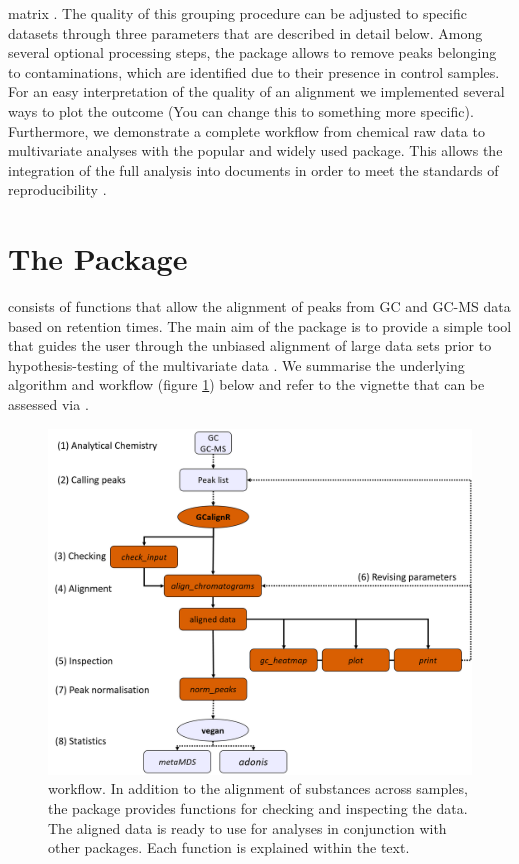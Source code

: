 matrix . The quality of this grouping procedure can be adjusted to
specific datasets through three parameters that are described in detail
below. Among several optional processing steps, the package allows to
remove peaks belonging to contaminations, which are identified due to
their presence in control samples. For an easy interpretation of the
quality of an alignment we implemented several ways to plot the outcome
(You can change this to something more specific). Furthermore, we
demonstrate a complete workflow from chemical raw data to multivariate
analyses with the popular and widely used
\href{https://cran.r-project.org/web/packages/vegan/index.html}{}
\citep{Oksanen.2016} package. This allows the integration of the full
analysis into  documents \citep{Allaire.2016} in order
to meet the standards of reproducibility \citep{Peng.2011}.

\section{The Package}

 consists of functions that allow the alignment of peaks
from GC and GC-MS data based on retention times. The main aim of the
package is to provide a simple tool that guides the user through the
unbiased alignment of large data sets prior to hypothesis-testing of the
multivariate data \citep{Anderson.2001}. We summarise the underlying
algorithm and workflow (figure \ref{figure:workflow}) below and refer to
the vignette that can be assessed via
.

\begin{figure}[htbp]
  \centering
  \includegraphics[width=13cm]{figures/workflow}
  \caption{ workflow. In addition to the alignment of substances across samples, the package provides functions for checking and inspecting the data. The aligned data is ready to use for analyses in conjunction with other packages. Each function is explained within the text.}
  \label{figure:workflow}
\end{figure}

